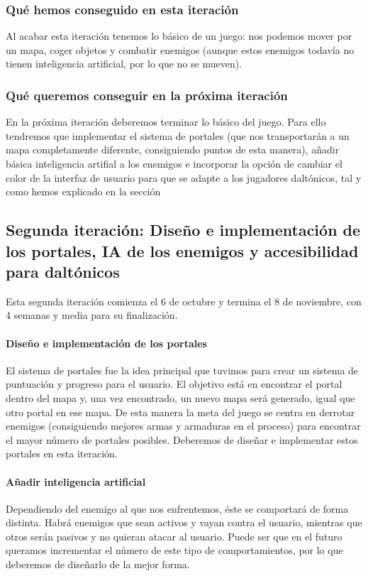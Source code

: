 \subsubsection{Qué hemos conseguido en esta iteración}

Al acabar esta iteración tenemos lo básico de un juego: nos podemos mover por un mapa, coger objetos y combatir enemigos (aunque estos enemigos todavía no tienen inteligencia artificial, por lo que no se mueven).

\subsubsection{Qué queremos conseguir en la próxima iteración}

En la próxima iteración deberemos terminar lo básico del juego. Para ello tendremos que implementar el sistema de portales (que nos transportarán a un mapa completamente diferente, consiguiendo puntos de esta manera), añadir básica inteligencia artifial a los enemigos e incorporar la opción de cambiar el color de la interfaz de usuario para que se adapte a los jugadores daltónicos, tal y como hemos explicado en la sección \label{sec:daltonicossolventar}

\subsection{Segunda iteración: Diseño e implementación de los portales, IA de los enemigos y accesibilidad para daltónicos}

Esta segunda iteración comienza el 6 de octubre y termina el 8 de noviembre, con 4 semanas y media para su finalización.

\paragraph{Diseño e implementación de los portales} El sistema de portales fue la idea principal que tuvimos para crear un sistema de puntuación y progreso para el usuario. El objetivo está en encontrar el portal dentro del mapa y, una vez encontrado, un nuevo mapa será generado, igual que otro portal en ese mapa. De esta manera la meta del juego se centra en derrotar enemigos (consiguiendo mejores armas y armaduras en el proceso) para encontrar el mayor número de portales posibles.
Deberemos de diseñar e implementar estos portales en esta iteración.

\paragraph{Añadir inteligencia artificial} Dependiendo del enemigo al que nos enfrentemos, éste se comportará de forma distinta. Habrá enemigos que sean activos y vayan contra el usuario, mientras que otros serán pasivos y no quieran atacar al usuario. Puede ser que en el futuro queramos incrementar el número de este tipo de comportamientos, por lo que deberemos de diseñarlo de la mejor forma.

